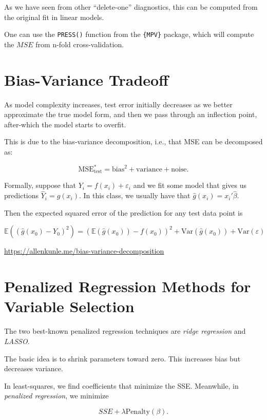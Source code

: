 \documentclass[
  letterpaper,
  DIV=11,
  numbers=noendperiod]{scrreport}
\begin{document}
As we have seen from other ``delete-one'' diagnostics, this can be
computed from the original fit in linear models.

One can use the \texttt{PRESS()} function from the \texttt{\{MPV\}}
package, which will compute the \(MSE\) from n-fold cross-validation.

\hypertarget{bias-variance-tradeoff}{%
\section{Bias-Variance Tradeoff}\label{bias-variance-tradeoff}}

As model complexity increases, test error initially decreases as we
better approximate the true model form, and then we pass through an
inflection point, after-which the model starts to overfit.

This is due to the bias-variance decomposition, i.e., that MSE can be
decomposed as:

\[\text{MSE}_{\text{test}}^* = \text{bias}^2 + \text{variance} + \text{noise}.\]

Formally, suppose that \(Y_i = f(x_i) + \varepsilon_i\) and we fit some
model that gives us predictions \(\hat Y_i = \hat g(x_i).\) In this
class, we usually have that \(\hat g(x_i) = x_i' \hat \beta\).

Then the expected squared error of the prediction for any test data
point is

\[\mathbb E((\hat g(x_0) - Y_0)^2) = (\mathbb E(\hat g(x_0)) - f(x_0))^2 + \text{Var}(\hat g(x_0)) + \text{Var}(\varepsilon)\]

\url{https://allenkunle.me/bias-variance-decomposition}

\hypertarget{penalized-regression-methods-for-variable-selection}{%
\section{Penalized Regression Methods for Variable
Selection}\label{penalized-regression-methods-for-variable-selection}}

The two best-known penalized regression techniques are \emph{ridge
regression} and \emph{LASSO}.

The basic idea is to shrink parameters toward zero. This increases bias
but decreases variance.

In least-squares, we find coefficients that minimize the SSE. Meanwhile,
in \emph{penalized regression}, we minimize

\[SSE + \lambda \text{Penalty}(\beta).\]
\end{document}
